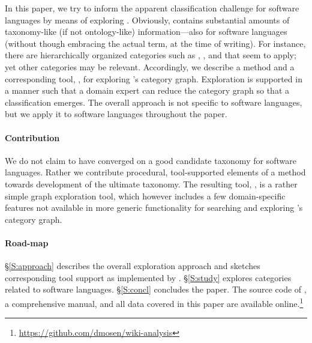 In this paper, we try to inform the apparent classification challenge for software languages by means of exploring \Wikipedia. Obviously, \Wikipedia{} contains substantial amounts of taxonomy-like (if not ontology-like) information---also for software languages (without though embracing the actual term, at the time of writing). For instance, there are hierarchically organized categories such as , , and  that seem to apply; yet other categories may be relevant. Accordingly, we describe a method and a corresponding tool, \WikiTax, for exploring \Wikipedia's category graph. Exploration is supported in a manner such that a domain expert can reduce the category graph so that a classification emerges. The overall approach is not specific to software languages, but we apply it to software languages throughout the paper. 

\vspace{-27\in}

\paragraph*{\textbf{Contribution}} We do not claim to have converged on a good candidate taxonomy for software languages. Rather we contribute procedural, tool-supported elements of a method towards development of the ultimate taxonomy. The resulting tool, \WikiTax, is a rather simple graph exploration tool, which however includes a few domain-specific features not available in more generic functionality for searching and exploring \Wikipedia's category graph.

\vspace{-27\in}

\paragraph*{\textbf{Road-map}} \S\ref{S:approach} describes the overall exploration approach and sketches corresponding tool support as implemented by \WikiTax. \S\ref{S:study} explores \Wikipedia{} categories related to software languages. \S\ref{S:concl} concludes the paper. The source code of \WikiTax, a comprehensive manual, and all data covered in this paper are available online.\footnote{\url{https://github.com/dmosen/wiki-analysis}}

